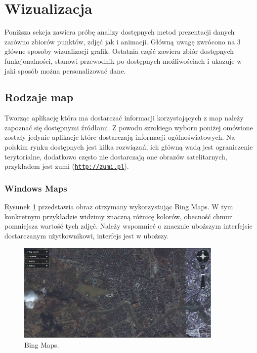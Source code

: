 \clearpage
\newpage
\section{Wizualizacja}
\label{sec:wizualizacja}

Poniższa sekcja zawiera próbę analizy dostępnych metod prezentacji danych zarówno zbiorów punktów, zdjęć jak i animacji. Główną uwagę zwrócono na 3 główne sposoby wizualizacji grafik. Ostatnia część zawiera zbiór dostępnych funkcjonalności, stanowi przewodnik po dostępnych możliwościach i ukazuje w jaki sposób można personalizować dane.


\subsection{Rodzaje map}
\label{subsec:Rodzaje map}

Tworząc aplikację która ma dostarczać informacji korzystających z map należy zapoznać się dostępnymi źródłami. Z powodu szrokiego wyboru poniżej omówione zostały jedynie aplikacje które dostarczają informacji ogólnoświatowych. Na polskim rynku dostępnych jest kilka rozwiązań, ich główną wadą jest ograniczenie terytorialne, dodatkowo często nie dostarczają one obrazów satelitarnych, przykładem jest zumi (\underline{\texttt{http://zumi.pl}}).

\subsubsection{Windows Maps}
\label{subsubsec:Windows Maps}

Rysunek \ref{fig:bingMaps_1} przedstawia obraz otrzymany wykorzystując Bing Maps. W tym konkretnym przykładzie widzimy znaczną różnicę kolorów, obecność chmur pomniejsza wartość tych zdjęć. Należy wspomnieć o znacznie uboższym interfejsie dostarczanym użytkownikowi, interfejs jest w uboższy.

\begin{figure}[H]
  \centering
    \includegraphics[width=100mm]{ge/bing_1.jpg}
  \caption{Bing Maps.}
  \label{fig:bingMaps_1}
\end{figure}

